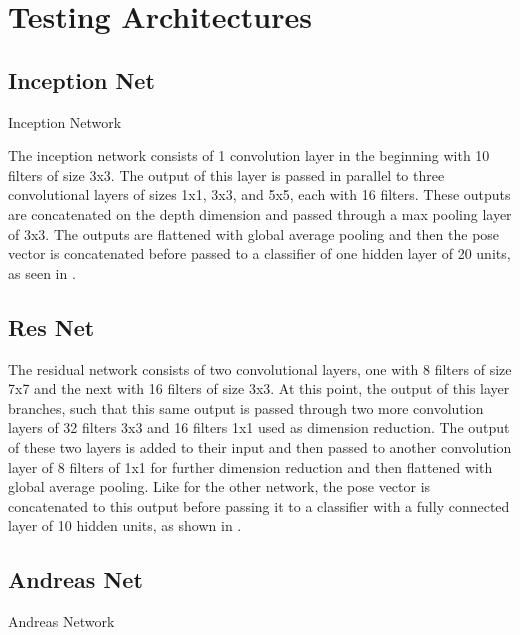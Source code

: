 
\section{Testing Architectures}
\label{sec:archs}




\subsection{Inception Net}
Inception Network~\cite{szegedy2015going}

The inception network consists of 1 convolution layer in the beginning with 10 filters of size 3x3. 
The output of this layer is passed in parallel to three convolutional layers of sizes 1x1, 3x3, and 5x5, each with 16 filters. 
These outputs are concatenated on the depth dimension and passed through a max pooling layer of 3x3. 
The outputs are flattened with global average pooling and then the pose vector is concatenated before passed to a classifier of one hidden layer of 20 units, as seen in . 

\subsection{Res Net}

The residual network consists of two convolutional layers, one with 8 filters of size 7x7 and the next with 16 filters of size 3x3.
At this point, the output of this layer branches, such that this same output is passed through two more convolution layers of 32 filters 3x3 and 16 filters 1x1 used as dimension reduction. 
The output of these two layers is added to their input and then passed to another convolution layer of 8 filters of 1x1 for further dimension reduction and then flattened with global average pooling. 
Like for the other network, the pose vector is concatenated to this output before passing it to a classifier with a fully connected layer of 10 hidden units, as shown in .

\subsection{Andreas Net}
Andreas Network ~\cite{viereck2017learning}
